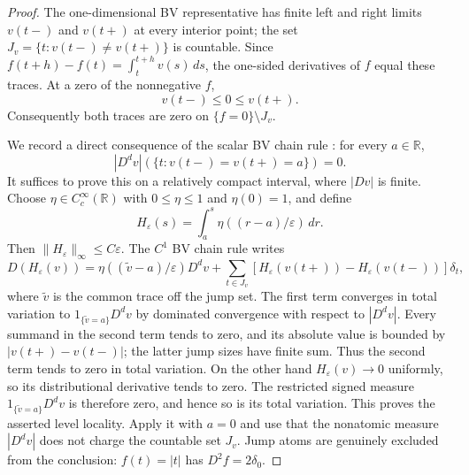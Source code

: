 \begin{proof}
The one-dimensional BV representative has finite left and right
limits $v(t-)$ and $v(t+)$ at every interior point; the set
$J_v=\{t:v(t-)\ne v(t+)\}$ is countable.  Since
$f(t+h)-f(t)=\int_t^{t+h}v(s)\,ds$, the one-sided derivatives of
$f$ equal these traces.  At a zero of the nonnegative $f$,
\[
 v(t-)\leq0\leq v(t+).
\]
Consequently both traces are zero on $\{f=0\}\setminus J_v$.

We record a direct consequence of the scalar BV chain rule
\cite{AmbrosioFuscoPallara2000}: for every $a\in\mathbb R$,
\[
 |D^dv|(\{t:v(t-)=v(t+)=a\})=0.
\]
It suffices to prove this on a relatively compact interval, where
$|Dv|$ is finite.  Choose $\eta\in C_c^\infty(\mathbb R)$ with
$0\leq\eta\leq1$ and $\eta(0)=1$, and define
\[
 H_\varepsilon(s)=\int_a^s\eta((r-a)/\varepsilon)\,dr.
\]
Then $\|H_\varepsilon\|_\infty\leq C\varepsilon$.
The $C^1$ BV chain rule writes
\[
 D(H_\varepsilon(v))
 =\eta((\widetilde v-a)/\varepsilon)D^dv
 +\sum_{t\in J_v}
       [H_\varepsilon(v(t+))-H_\varepsilon(v(t-))]\delta_t,
\]
where $\widetilde v$ is the common trace off the jump set.
The first term converges in total variation to
$1_{\{\widetilde v=a\}}D^dv$ by dominated convergence with respect
to $|D^dv|$.  Every summand in the second term tends to zero, and
its absolute value is bounded by $|v(t+)-v(t-)|$; the latter jump
sizes have finite sum.  Thus the second term tends to zero in total
variation.  On the other hand $H_\varepsilon(v)\to0$ uniformly, so
its distributional derivative tends to zero.  The restricted signed
measure $1_{\{\widetilde v=a\}}D^dv$ is therefore zero, and hence
so is its total variation.  This proves the asserted level locality.
Apply it with $a=0$ and use that the nonatomic measure $|D^dv|$
does not charge the countable set $J_v$.
Jump atoms are genuinely excluded from the conclusion: $f(t)=|t|$
has $D^2f=2\delta_0$.
\end{proof}


